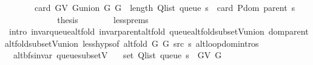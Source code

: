 \begin{isabellebody}
\ \ \ \ \ \ \ card\ {\isacharparenleft}{\kern0pt}G{\isachardot}{\kern0pt}V\ {\isacharparenleft}{\kern0pt}G{\isachardot}{\kern0pt}union\ G{}\ G{}{\isacharparenright}{\kern0pt}{\isacharparenright}{\kern0pt}\ {\isacharplus}{\kern0pt}\ length\ {\isacharparenleft}{\kern0pt}Q{\isacharunderscore}{\kern0pt}list\ {\isacharparenleft}{\kern0pt}queue\ s{\isacharparenright}{\kern0pt}{\isacharparenright}{\kern0pt}\ {\isacharminus}{\kern0pt}\ card\ {\isacharparenleft}{\kern0pt}P{\isachardot}{\kern0pt}dom\ {\isacharparenleft}{\kern0pt}parent\ s{\isacharparenright}{\kern0pt}{\isacharparenright}{\kern0pt}{\isachardoublequoteclose}\isanewline
\ \ \ \ \ \ \isacommand{{\isachardot}{\kern0pt}}\isamarkupfalse%
\isanewline
\ \ \ \ \isamarkupfalse%
\ {\isacharquery}{\kern0pt}thesis\isanewline
\ \ \ \ \ \ \isamarkupfalse%
\ less{\isachardot}{\kern0pt}prems\isanewline
\ \ \ \ \ \ \isamarkupfalse%
\ {\isacharparenleft}{\kern0pt}intro\ invar{\isacharunderscore}{\kern0pt}queue{\isacharunderscore}{\kern0pt}alt{\isacharunderscore}{\kern0pt}fold\ invar{\isacharunderscore}{\kern0pt}parent{\isacharunderscore}{\kern0pt}alt{\isacharunderscore}{\kern0pt}fold\ queue{\isacharunderscore}{\kern0pt}alt{\isacharunderscore}{\kern0pt}fold{\isacharunderscore}{\kern0pt}subset{\isacharunderscore}{\kern0pt}V{\isacharunderscore}{\kern0pt}union\ dom{\isacharunderscore}{\kern0pt}parent{\isacharunderscore}{\kern0pt}alt{\isacharunderscore}{\kern0pt}fold{\isacharunderscore}{\kern0pt}subset{\isacharunderscore}{\kern0pt}V{\isacharunderscore}{\kern0pt}union\ less{\isachardot}{\kern0pt}hyps{\isacharbrackleft}{\kern0pt}of\ {\isachardoublequoteopen}alt{\isacharunderscore}{\kern0pt}fold\ G{}\ G{}\ src\ s{\isachardoublequoteclose}{\isacharbrackright}{\kern0pt}\ alt{\isacharunderscore}{\kern0pt}loop{\isachardot}{\kern0pt}domintros{\isacharparenright}{\kern0pt}\isanewline
\ \ \isamarkupfalse%
\isanewline
{}\isamarkupfalse%
%
\endisatagproof
{\isafoldproof}%
%
\isadelimproof
\isanewline
%
\endisadelimproof
%
\isadeliminvisible
\isanewline
%
\endisadeliminvisible
%
\isataginvisible
{}\isamarkupfalse%
\ {\isacharparenleft}{\kern0pt}\ alt{\isacharunderscore}{\kern0pt}bfs{\isacharunderscore}{\kern0pt}invar{\isacharparenright}{\kern0pt}\ queue{\isacharunderscore}{\kern0pt}subset{\isacharunderscore}{\kern0pt}V{\isacharcolon}{\kern0pt}\isanewline
\ \ \ {\isachardoublequoteopen}set\ {\isacharparenleft}{\kern0pt}Q{\isacharunderscore}{\kern0pt}list\ {\isacharparenleft}{\kern0pt}queue\ s{\isacharparenright}{\kern0pt}{\isacharparenright}{\kern0pt}\ {\isasymsubseteq}\ G{\isachardot}{\kern0pt}V\ G{\isachardoublequoteclose}%

\end{isabellebody}
